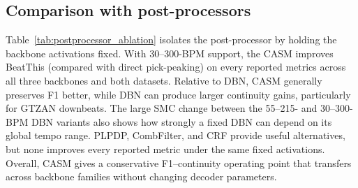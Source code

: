 \documentclass{article}
\begin{document}
\subsection{Comparison with post-processors}
Table~\ref{tab:postprocessor_ablation} isolates the post-processor by holding the backbone activations fixed. With 30--300-BPM support, the CASM improves BeatThis (compared with direct pick-peaking) on every reported metrics across all three backbones and both datasets. Relative to DBN, CASM generally preserves F1 better, while DBN can produce larger continuity gains, particularly for GTZAN downbeats. The large SMC change between the 55--215- and 30--300-BPM DBN variants also shows how strongly a fixed DBN can depend on its global tempo range. PLPDP, CombFilter, and CRF provide useful alternatives, but none improves every reported metric under the same fixed activations. Overall, CASM gives a conservative F1--continuity operating point that transfers across backbone families without changing decoder parameters.
\end{document}
